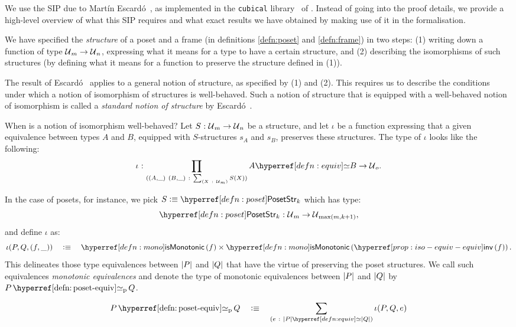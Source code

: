 We use the SIP due to Martín Escardó~\cite{escardo-uf-intro}, as implemented in the
\texttt{cubical} library~\cite{agda-cubical} of \veragda{}. Instead of going into the
proof details, we provide a high-level overview of what this SIP requires and what exact
results we have obtained by making use of it in the \veragda{} formalisation.

We have specified the \emph{structure} of a poset and a frame (in definitions
\ref{defn:poset} and \ref{defn:frame}) in two steps: (1) writing down a function of type
$\mathcal{U}{}_m \rightarrow \mathcal{U}{}_n$, expressing what it means for a type to have a certain structure,
and (2) describing the isomorphisms of such structures (by defining what it means for a
function to preserve the structure defined in (1)).

The result of Escardó~\cite{escardo-uf-intro} applies to a general notion of structure, as
specified by (1) and (2). This requires us to describe the conditions under which a notion
of isomorphism of structures is well-behaved. Such a notion of structure that is equipped
with a well-behaved notion of isomorphism is called a \emph{standard notion of structure}
by Escard\'{o}~\cite{escardo-uf-intro}.

When is a notion of isomorphism well-behaved? Let $S\hspace{0.1mm}:\hspace{0.1mm}\mathcal{U}{}_m \rightarrow \mathcal{U}{}_n$ be a
structure, and let $\iota$ be a function expressing that a given equivalence between types $A$
and $B$, equipped with $S$-structures $s_A$ and $s_B$, preserves these structures. The
type of $\iota$ looks like the following:
\begin{equation*}
  \oftyI{\iota}{%
    \pity{(A , \_)~(B , \_)}{\sigmaty{X}{\univ{}_m}{S(X)}}{%
      \typequiv{A}{B} \rightarrow \univ{}_o
    }
  }.
\end{equation*}

In the case of posets, for instance, we pick $S \is \posetstrnm{}_k$ which has type:
\begin{equation*}
  \oftyI{\posetstrnm{}_k}{\univ{}_m \rightarrow \univ{}_{\max(m, k+1)}},
\end{equation*}
and define $\iota$ as:
\begin{equation*}
  \iota(P, Q, (f , \_)) \quad\is\quad \ismonotonic{f} \times \ismonotonic{\invequiv{f}}  .
\end{equation*}
This delineates those type equivalences between $\left| P \right|$ and $\left| Q \right|$ that have the
virtue of preserving the poset structures. We call such equivalences
\emph{monotonic equivalences} and denote the type of monotonic equivalences between
$\left| P \right|$ and $\left| Q \right|$ by $\posetequiv{P}{Q}$.
\begin{defn}\label{defn:poset-equiv}
  \begin{equation*}
    \posetequiv{P}{Q} \quad\is\quad \sigmaty{e}{\typequiv{\abs{P}}{\abs{Q}}}{\iota(P, Q, e)}
  \end{equation*}
\end{defn}


